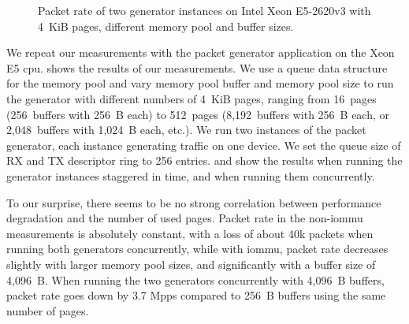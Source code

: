 \begin{figure}%
	\centering
    \par

    \caption{Packet rate of two generator instances on Intel Xeon E5-2620v3 with
    4~KiB pages, different memory pool and buffer sizes.}
	\label{fig:page-size-generator}
\end{figure}

We repeat our measurements with the packet generator application on the Xeon E5
\ac{cpu}.  shows the results of our measurements.
We use a queue data structure for the memory pool and vary memory pool buffer
and memory pool size to run the generator with different numbers of 4~KiB pages,
ranging from 16~pages (256~buffers with 256~B each) to 512~pages (8,192~buffers
with 256~B each, or 2,048~buffers with 1,024~B each, etc.). We run two instances
of the packet generator, each instance generating traffic on one device. We set
the queue size of RX and TX descriptor ring to 256 entries.
 and
 show the results
when running the generator instances staggered in time,
 and
 when running them
concurrently.

To our surprise, there seems to be no strong correlation between performance
degradation and the number of used pages. Packet rate in the non-\ac{iommu}
measurements is absolutely constant, with a loss of about 40k packets when
running both generators concurrently, while with \ac{iommu}, packet rate
decreases slightly with larger memory pool sizes, and significantly with a
buffer size of 4,096~B. When running the two generators concurrently with
4,096~B buffers, packet rate goes down by 3.7 Mpps compared to 256~B buffers
using the same number of pages.


